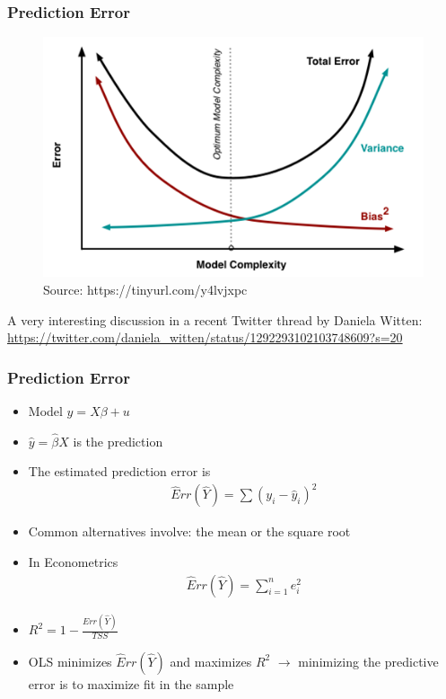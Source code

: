 \documentclass[
  shownotes,
  xcolor={svgnames},
  hyperref={colorlinks,citecolor=DarkBlue,linkcolor=DarkRed,urlcolor=DarkBlue}
  ]{beamer}
\begin{document}

\begin{frame}
\frametitle{Prediction Error}

\begin{figure}[H] \centering
  \centering
  \includegraphics[scale=0.50]{figures/medium_bias_variance_trade_off.png}
  \\
  \tiny
  Source: https://tinyurl.com/y4lvjxpc
\end{figure}


{\tiny A very interesting discussion in a recent Twitter thread by Daniela Witten: \url{https://twitter.com/daniela_witten/status/1292293102103748609?s=20}}
\end{frame}
\begin{frame}
\frametitle{Prediction Error}

\begin{itemize}
  \item Model $y=X\beta +u$
  \item $\hat y=\hat \beta X$ is the prediction 
  \item The estimated prediction error is 
  \begin{align}
    \hat Err (\hat Y ) = \sum (y_i-\hat y_i)^2
  \end{align}

  \item Common alternatives involve: the mean or the square root
  \item In Econometrics 
  \begin{align}
    \hat Err (\hat Y ) = \sum_{i=1}^n e_i^2
  \end{align}
  \item $R^2=1- \frac{Err (\hat Y )}{TSS}$ 
  
  \item OLS minimizes $\hat Err (\hat Y )$ and maximizes $R^2$ $\rightarrow$  minimizing the predictive error is to maximize fit in the sample

  
\end{itemize}
\end{frame}
\end{document}
